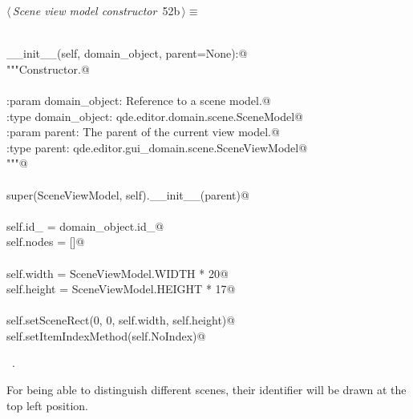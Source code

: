 \documentclass[
    a4paper,      %
    10pt,         %
    openright,    %
    notitlepage,  %
    parskip=half, %
]{scrreprt}       %
\theoremstyle{definition}                    %
\begin{document}
\begin{flushleft} \small
\begin{minipage}{\linewidth}\label{scrap81}\raggedright\small
{} $\langle\,${\itshape Scene view model constructor}\nobreak\ {\footnotesize {52b}}$\,\rangle\equiv$
\vspace{-1ex}
\begin{list}{}{} \item
\mbox{}\lstinline@@\\
\mbox{}\lstinline@def __init__(self, domain_object, parent=None):@\\
\mbox{}\lstinline@   """Constructor.@\\
\mbox{}\lstinline@@\\
\mbox{}\lstinline@   :param domain_object: Reference to a scene model.@\\
\mbox{}\lstinline@   :type  domain_object: qde.editor.domain.scene.SceneModel@\\
\mbox{}\lstinline@   :param parent:        The parent of the current view model.@\\
\mbox{}\lstinline@   :type parent:         qde.editor.gui_domain.scene.SceneViewModel@\\
\mbox{}\lstinline@   """@\\
\mbox{}\lstinline@@\\
\mbox{}\lstinline@   super(SceneViewModel, self).__init__(parent)@\\
\mbox{}\lstinline@@\\
\mbox{}\lstinline@   self.id_ = domain_object.id_@\\
\mbox{}\lstinline@   self.nodes = []@\\
\mbox{}\lstinline@@\\
\mbox{}\lstinline@   self.width = SceneViewModel.WIDTH * 20@\\
\mbox{}\lstinline@   self.height = SceneViewModel.HEIGHT * 17@\\
\mbox{}\lstinline@@\\
\mbox{}\lstinline@   self.setSceneRect(0, 0, self.width, self.height)@\\
\mbox{}\lstinline@   self.setItemIndexMethod(self.NoIndex)@\\
\mbox{}\lstinline@@{\NWsep}
\end{list}
\vspace{-1.5ex}
\footnotesize
\begin{list}{}{\setlength{\itemsep}{-\parsep}\setlength{\itemindent}{-\leftmargin}}
\item \NWtxtMacroRefIn\ .

\item{}
\end{list}
\end{minipage}\vspace{4ex}
\end{flushleft}
For being able to distinguish different scenes, their identifier will be drawn
at the top left position.
\end{document}
